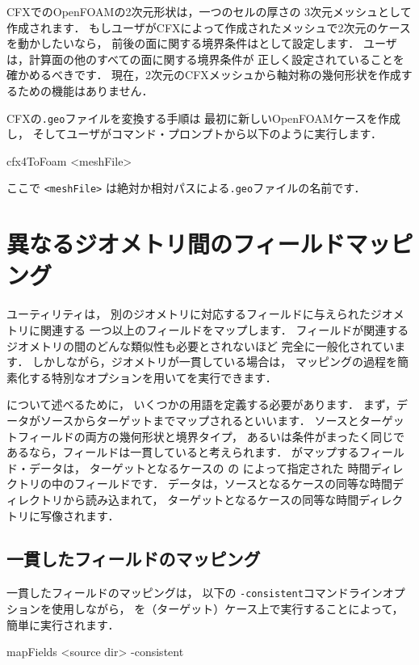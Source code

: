 CFXでのOpenFOAMの2次元形状は，一つのセルの厚さの
3次元メッシュとして作成されます．
もしユーザがCFXによって作成されたメッシュで2次元のケースを動かしたいなら，
前後の面に関する境界条件はとして設定します．
ユーザは，計算面の他のすべての面に関する境界条件が
正しく設定されていることを確かめるべきです．
現在，2次元のCFXメッシュから軸対称の幾何形状を作成するための機能はありません．

CFXの\texttt{.geo}ファイルを変換する手順は
最初に新しいOpenFOAMケースを作成し，
そしてユーザがコマンド・プロンプトから以下のように実行します．
\begin{OFverbatim}[terminal]
cfx4ToFoam <meshFile>
\end{OFverbatim}
ここで \texttt{<meshFile>} は絶対か相対パスによる\texttt{.geo}ファイルの名前です．



\section{異なるジオメトリ間のフィールドマッピング}
\label{sec:5.6}
%
%
ユーティリティは，
別のジオメトリに対応するフィールドに与えられたジオメトリに関連する
一つ以上のフィールドをマップします．
フィールドが関連するジオメトリの間のどんな類似性も必要とされないほど
完全に一般化されています．
しかしながら，ジオメトリが一貫している場合は，
マッピングの過程を簡素化する特別なオプションを用いてを実行できます．

について述べるために，
いくつかの用語を定義する必要があります．
まず，データがソースからターゲットまでマップされるといいます．
ソースとターゲットフィールドの両方の幾何形状と境界タイプ，
あるいは条件がまったく同じであるなら，フィールドは一貫していると考えられます．
がマップするフィールド・データは，
ターゲットとなるケースの
%
%
の
によって指定された
時間ディレクトリの中のフィールドです．
データは，ソースとなるケースの同等な時間ディレクトリから読み込まれて，
ターゲットとなるケースの同等な時間ディレクトリに写像されます．


\subsection{一貫したフィールドのマッピング}
\label{ssec:5.6.1}
一貫したフィールドのマッピングは，
以下の \texttt{-consistent}コマンドラインオプションを使用しながら，
%
%
を（ターゲット）ケース上で実行することによって，
簡単に実行されます．
\begin{OFverbatim}[terminal]
mapFields <source dir> -consistent
\end{OFverbatim}

